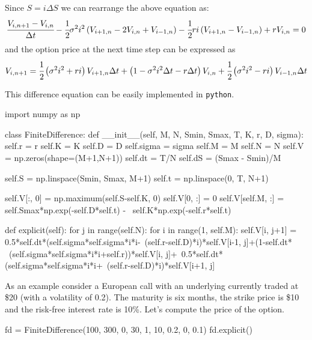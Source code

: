 Since $S=i\Delta S$ we can rearrange the above equation as:
\begin{equation}
\cfrac{V_{i, n+1}-V_{i, n}}{\Delta t} - \cfrac{1}{2}\sigma^2 i^2
\left(V_{i+1, n}-2V_{i, n}+V_{i-1, n}\right) - \cfrac{1}{2}ri
\left(V_{i+1,n}-V_{i-1,n}\right) + rV_{i,n} = 0
\end{equation}
\noindent
and the option price at the next time step can be expressed as
\begin{equation}
V_{i, n+1} = \cfrac{1}{2}\left(\sigma^2 i^2+ri\right)V_{i+1,n} \Delta t +
\left(1-\sigma^2 i^2\Delta t-r\Delta t \right)V_{i,n} +
\cfrac{1}{2}\left(\sigma^2 i^2 - ri\right)V_{i-1,n} \Delta t
\end{equation}

This difference equation can be easily implemented in \texttt{python}.
\begin{ipython}
import numpy as np

class FiniteDifference:
    def __init__(self, M, N, Smin, Smax, T, K, r, D, sigma):
        self.r = r
        self.K = K
        self.D = D
        self.sigma = sigma
        self.M = M
        self.N = N
        self.V = np.zeros(shape=(M+1,N+1))   
        self.dt = T/N
        self.dS = (Smax - Smin)/M

        self.S = np.linspace(Smin, Smax, M+1)
        self.t = np.linspace(0, T, N+1)

        self.V[:, 0] = np.maximum(self.S-self.K, 0)
        self.V[0, :] = 0
        self.V[self.M, :] = self.Smax*np.exp(-self.D*self.t) - \
                            self.K*np.exp(-self.r*self.t)

    def explicit(self):
        for j in range(self.N):
            for i in range(1, self.M):
                self.V[i, j+1] = 0.5*self.dt*(self.sigma*self.sigma*i*i-\
                                 (self.r-self.D)*i)*self.V[i-1, j]+(1-self.dt* \
                                 (self.sigma*self.sigma*i*i+self.r))*self.V[i, j]+\
                                 0.5*self.dt*(self.sigma*self.sigma*i*i+\
                                 (self.r-self.D)*i)*self.V[i+1, j]
\end{ipython}             

As an example consider a European call with an underlying currently traded at \$20 (with a volatility of 0.2). The maturity is six months, the strike price is \$10 and the risk-free interest rate is 10\%. Let's compute the price of the option.
\begin{ipython}
fd = FiniteDifference(100, 300, 0, 30, 1, 10, 0.2, 0, 0.1)
fd.explicit()
\end{ipython}

